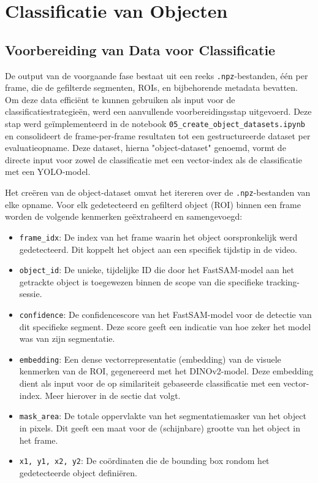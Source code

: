 \section{Classificatie van Objecten}

\subsection{Voorbereiding van Data voor Classificatie}

De output van de voorgaande fase bestaat uit een reeks \texttt{.npz}-bestanden, één per frame, 
die de gefilterde segmenten, ROIs, en bijbehorende metadata bevatten. 
Om deze data efficiënt te kunnen gebruiken als input voor de classificatiestrategieën, werd een aanvullende voorbereidingsstap uitgevoerd. 
Deze stap werd geïmplementeerd in de notebook \texttt{05\_create\_object\_datasets.ipynb} en consolideert de frame-per-frame 
resultaten tot een gestructureerde dataset per evaluatieopname. 
Deze dataset, hierna "object-dataset" genoemd, vormt de directe input voor zowel de classificatie met een vector-index als de 
classificatie met een YOLO-model.

Het creëren van de object-dataset omvat het itereren over de \texttt{.npz}-bestanden van elke opname. 
Voor elk gedetecteerd en gefilterd object (ROI) binnen een frame worden de volgende kenmerken geëxtraheerd en samengevoegd:
\begin{itemize}
    \item \texttt{frame\_idx}: De index van het frame waarin het object oorspronkelijk werd gedetecteerd. 
    Dit koppelt het object aan een specifiek tijdstip in de video.
    \item \texttt{object\_id}: De unieke, tijdelijke ID die door het FastSAM-model aan het getrackte object 
    is toegewezen binnen de scope van die specifieke tracking-sessie.
    \item \texttt{confidence}: De confidencescore van het FastSAM-model voor de detectie van dit specifieke segment. 
    Deze score geeft een indicatie van hoe zeker het model was van zijn segmentatie.
    \item \texttt{embedding}: Een dense vectorrepresentatie (embedding) van de visuele kenmerken van de ROI, 
    gegenereerd met het DINOv2-model. 
    Deze embedding dient als input voor de op similariteit gebaseerde classificatie met een vector-index.
    Meer hierover in de sectie dat volgt.
    \item \texttt{mask\_area}: De totale oppervlakte van het segmentatiemasker van het object in pixels. 
    Dit geeft een maat voor de (schijnbare) grootte van het object in het frame.
    \item \texttt{x1, y1, x2, y2}: De coördinaten die de bounding box rondom het gedetecteerde object definiëren. 
\end{itemize}

